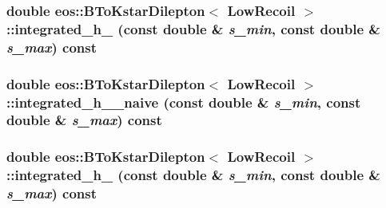 \label{classeos_1_1BToKstarDilepton_3_01LowRecoil_01_4_a39d76e0ebc3397bfd09e3e5574e3d279}
\hypertarget{classeos_1_1BToKstarDilepton_3_01LowRecoil_01_4_a0d85c6d185e67dac3c1f618e6843dcdd}{
\subsubsection[{integrated\_\-h\_\-2}]{\setlength{\rightskip}{0pt plus 5cm}double eos::BToKstarDilepton$<$ {\bf LowRecoil} $>$::integrated\_\-h\_ (const double \& {\em s\_\-min}, \/  const double \& {\em s\_\-max}) const}}
\label{classeos_1_1BToKstarDilepton_3_01LowRecoil_01_4_a0d85c6d185e67dac3c1f618e6843dcdd}
\hypertarget{classeos_1_1BToKstarDilepton_3_01LowRecoil_01_4_ae7215ebd2b9553001309c90d70e3bec5}{
\subsubsection[{integrated\_\-h\_\-2\_\-naive}]{\setlength{\rightskip}{0pt plus 5cm}double eos::BToKstarDilepton$<$ {\bf LowRecoil} $>$::integrated\_\-h\_\_\-naive (const double \& {\em s\_\-min}, \/  const double \& {\em s\_\-max}) const}}
\label{classeos_1_1BToKstarDilepton_3_01LowRecoil_01_4_ae7215ebd2b9553001309c90d70e3bec5}
\hypertarget{classeos_1_1BToKstarDilepton_3_01LowRecoil_01_4_a635c2a461565e3da3567758e05411d49}{
\subsubsection[{integrated\_\-h\_\-3}]{\setlength{\rightskip}{0pt plus 5cm}double eos::BToKstarDilepton$<$ {\bf LowRecoil} $>$::integrated\_\-h\_ (const double \& {\em s\_\-min}, \/  const double \& {\em s\_\-max}) const}}
\label{classeos_1_1BToKstarDilepton_3_01LowRecoil_01_4_a635c2a461565e3da3567758e05411d49}
